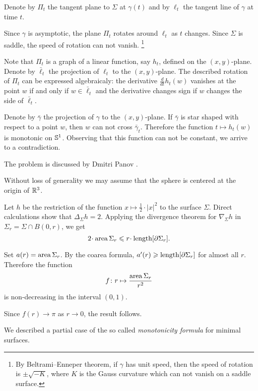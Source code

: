 Denote by $\Pi_t$ the tangent plane to $\Sigma$ at $\gamma(t)$ and by $\ell_t$ the tangent line of $\gamma$ at time $t$.

Since $\gamma$ is asymptotic, the plane $\Pi_t$ rotates around $\ell_t$ as $t$ changes.
Since $\Sigma$ is saddle, the speed of rotation can not vanish.%
\footnote{By Beltrami--Enneper theorem, if $\gamma$ has unit speed, then the speed of rotation is $\pm\sqrt{-K}$, where $K$ is the Gauss curvature which can not vanish on a saddle surface.}

Note that $\Pi_t$ is a graph of a linear function, say $h_t$, defined on the $(x, y)$-plane.
Denote by $\bar\ell_t$ the projection of $\ell_t$ to the $(x, y)$-plane.
The described rotation of $\Pi_t$ can be expressed algebraicaly:
the derivative $\tfrac{d}{dt}h_t(w)$ vanishes at the point $w$ if and only if $w\in \bar\ell_t$ 
and the derivative changes sign if $w$ changes the side of $\bar\ell_t$.

Denote by $\bar\gamma$ the projection of $\gamma$ to the $(x, y)$-plane.
If $\bar\gamma$ is star shaped with respect to a point $w$, then $w$ can not cross $\bar\gamma_t$.
Therefore the function $t\mapsto h_t(w)$ is monotonic on $\mathbb{S}^1$.
Observing that this function can not be constant, we arrive to a contradiction.\qeds

The problem is discussed by Dmitri Panov \cite[see][]{panov-curves}.

Without loss of generality we may assume that the sphere is centered at the origin of $\mathbb{R}^3$.

Let $h$ be the restriction of the function $x\mapsto \tfrac12\cdot|x|^2$ to the surface $\Sigma$.
Direct calculations show that $\Delta_\Sigma h =  2$.
Applying the divergence theorem for $\nabla_\Sigma h$
in $\Sigma_r=\Sigma\cap B(0,r)$, we get
\[2\cdot \area\Sigma_r\le r\cdot\length [\partial\Sigma_r].\]

Set $a(r)=\operatorname{\rm area}\nolimits\Sigma_r$.
By the coarea formula, $a'(r)\geqslant\operatorname{\rm length} [\partial\Sigma_r]$ for almost all $r$.
Therefore the function
\[f\colon r\mapsto \frac{\operatorname{\rm area}\nolimits\Sigma_r}{r^2}
\]
is non-decreasing in the interval $(0,1)$.

Since $f(r)\to \pi$ as $r\to0$, the result follows.\qeds

We described a partial case of the so called \emph{monotonicity formula} for minimal surfaces.

